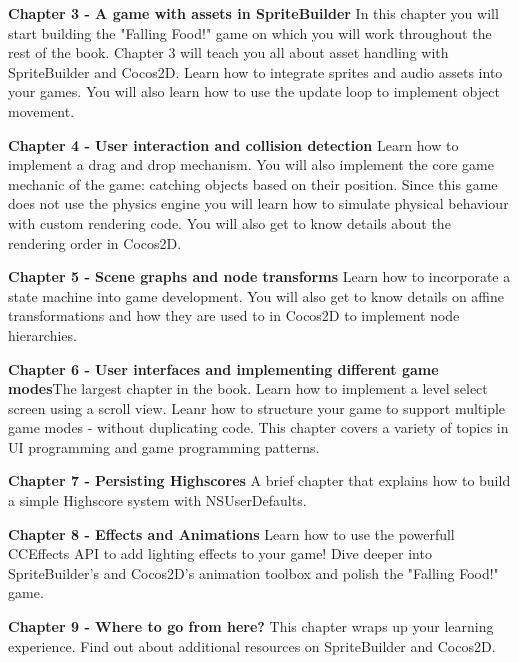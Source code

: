 \textbf{Chapter 3 - A game with assets in SpriteBuilder}\newline
In this chapter you will start building the "Falling Food!" game on which you will work throughout the rest of the book. Chapter 3 will teach you all about asset handling with SpriteBuilder and Cocos2D. Learn how to integrate sprites and audio assets into your games. You will also learn how to use the update loop to implement object movement.


\textbf{Chapter 4 - User interaction and collision detection}\newline
Learn how to implement a drag and drop mechanism. You will also implement the core game mechanic of the game: catching objects based on their position. Since this game does not use the physics engine you will learn how to simulate physical behaviour with custom rendering code. You will also get to know details about the rendering order in Cocos2D.


\textbf{Chapter 5 - Scene graphs and node transforms}\newline
Learn how to incorporate a state machine into game development. You will also get to know details on affine transformations and how they are used to in Cocos2D to implement node hierarchies.


\textbf{Chapter 6 - User interfaces and implementing different game
modes}\newline The largest chapter in the book. Learn how to implement a level select screen using a scroll view. Leanr how to structure your game to support multiple game modes - without duplicating code. This chapter covers a variety of topics in UI programming and game programming patterns.


\textbf{Chapter 7 - Persisting Highscores}\newline
A brief chapter that explains how to build a simple Highscore system with NSUserDefaults.


\textbf{Chapter 8 - Effects and Animations}\newline
Learn how to use the powerfull CCEffects API to add lighting effects to your game! Dive deeper into SpriteBuilder's and Cocos2D's animation toolbox and polish the "Falling Food!" game.


\textbf{Chapter 9 - Where to go from here?}\newline
This chapter wraps up your learning experience. Find out about additional resources on SpriteBuilder and Cocos2D.

